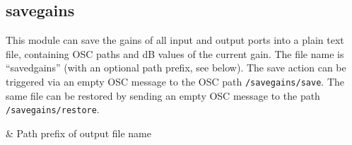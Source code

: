\subsection{savegains}\label{sec:savegains}

This module can save the gains of all input and output ports into a
plain text file, containing OSC paths and dB values of the current
gain.
%
The file name is ``savedgains'' (with an optional path prefix, see below).
%
The save action can be triggered via an empty OSC message to the OSC
path \verb!/savegains/save!.
%
The same file can be restored by sending an empty OSC message to the
path \verb!/savegains/restore!.

\begin{tscattributes}
 & Path prefix of output file name \\
\end{tscattributes}
